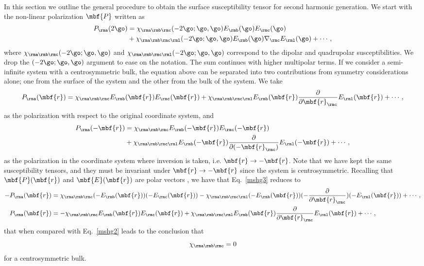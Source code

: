 \documentclass[floatfix,prb,aps,superscriptaddress,11pt,preprint,letterpaper]{revtex4}
\begin{document}
In this section we outline the general procedure to obtain the 
surface susceptibility tensor for second harmonic generation.
We start with the 
non-linear polarization $\mbf{P}$ written as
\begin{align}\label{mshg}
P_{\rma}(2\go)&=\chi_{\rma\rmb\rmc}(-2\go;\go,\go)
E_{\rmb}(\go)
E_{\rmc}(\go)
\nonumber \\
&+
\chi_{\rma\rmb\rmc\rml}(-2\go;\go,\go)
E_{\rmb}(\go)\nabla_{\rmc} E_{\rml}(\go)
+\cdots,
\end{align}
where $\chi_{\rma\rmb\rmc}(-2\go;\go,\go)$ and 
$\chi_{\rma\rmb\rmc\rml}(-2\go;\go,\go)$
correspond to the dipolar and quadrupolar susceptibilities.
We drop  the $(-2\go;\go,\go)$ argument to ease on the notation.
The sum continues with higher multipolar terms.
If we consider a semi-infinite system with a centrosymmetric bulk, the
equation above can be separated into two contributions from symmetry 
considerations alone; one from the surface of the system and the other from
the bulk of the system. We take
\begin{equation}\label{mshg2}
P_{\rma}(\mbf{r})=\chi_{\rma\rmb\rmc}E_{\rmb}(\mbf{r})E_{\rmc}(\mbf{r})
+
\chi_{\rma\rmb\rmc\rml}E_{\rmb}(\mbf{r})\frac{\partial}{\partial
  \mbf{r}_{\rmc}} E_{\rml}(\mbf{r}) 
+\cdots,
\end{equation}
as the polarization with respect to the original coordinate system, and 
\begin{align}\label{mshg3}
P_{\rma}(-\mbf{r})&=\chi_{\rma\rmb\rmc}E_{\rmb}(-\mbf{r})E_{\rmc}(-\mbf{r})
\nonumber \\
&+
\chi_{\rma\rmb\rmc\rml}E_{\rmb}(-\mbf{r})\frac{\partial}{\partial(-
  \mbf{r}_{\rmc})} E_{\rml}(-\mbf{r}) 
+\cdots, 
\end{align}
as the polarization in the coordinate system where inversion is taken,
i.e. $\mbf{r} \to -\mbf{r}$. 
Note that we have kept the same susceptibility tensors, and they must be 
invariant under $\mbf{r} \to -\mbf{r}$ since the system is centrosymmetric.
Recalling that $\mbf{P}(\mbf{r})$ and $\mbf{E}(\mbf{r})$ are polar vectors 
\cite{jackson_classical_1975}, we have that Eq.~\eqref{mshg3} reduces to
\begin{align}\label{mshg4}
-P_{\rma}(\mbf{r})&=\chi_{\rma\rmb\rmc}(-E_{\rmb}(\mbf{r}))(-E_{\rmc}(\mbf{r}))
-
\chi_{\rma\rmb\rmc\rml}(-E_{\rmb}(\mbf{r}))(-\frac{\partial}{\partial\mbf{r}_{\rmc}})(-
E_{\rml}(\mbf{r})) 
+\cdots,
\nonumber \\
P_{\rma}(\mbf{r})&=-\chi_{\rma\rmb\rmc}E_{\rmb}(\mbf{r})E_{\rmc}(\mbf{r})
+
\chi_{\rma\rmb\rmc\rml}E_{\rmb}(\mbf{r})\frac{\partial}{\partial\mbf{r}_{\rmc}}
E_{\rml}(\mbf{r}) 
+\cdots,
\end{align}
that when compared with Eq.~\eqref{mshg2} leads to the conclusion that
\begin{equation}\label{sshg}
\chi_{\rma\rmb\rmc}=0
\end{equation}
for a centrosymmetric bulk.
\end{document}

